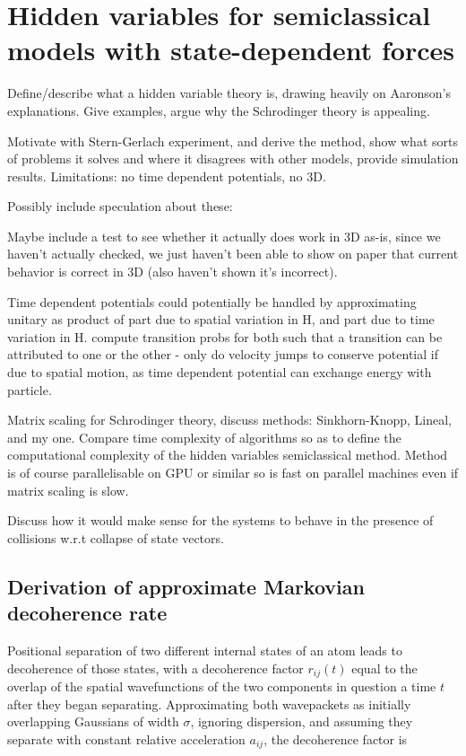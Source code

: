 
\chapter{Hidden variables for semiclassical models with state-dependent forces}

Define/describe what a hidden variable theory is, drawing heavily on Aaronson's~\cite{Aaronson2005} explanations. Give examples, argue why the Schrodinger theory is appealing.

Motivate with Stern-Gerlach experiment, and derive the method, show what sorts of problems it
solves and where it disagrees with other models, provide simulation results. Limitations: no time dependent potentials, no 3D.

Possibly include speculation about these:

Maybe include a test to see whether it actually does work in 3D as-is, since we haven't actually checked, we just haven't been able to show on paper that current behavior is correct in 3D (also haven't shown it's incorrect).

Time dependent potentials could potentially be handled by approximating unitary as product of part due to spatial variation in H, and part due to time variation in H. compute transition probs for both such that a transition can be attributed to one or the other - only do velocity jumps to conserve potential if due to spatial motion, as time dependent potential can exchange energy with particle.

Matrix scaling for Schrodinger theory, discuss methods: Sinkhorn-Knopp, Lineal, and my one. Compare time complexity of algorithms so as to define the computational complexity of the hidden variables semiclassical method. Method is of course parallelisable on GPU or similar so is fast on parallel machines even if matrix scaling is slow.

Discuss how it would make sense for the systems to behave in the presence of collisions w.r.t collapse of state vectors.

\section{Derivation of approximate Markovian decoherence rate}

Positional separation of two different internal states of an atom leads to decoherence of those states, with a decoherence factor $r_{ij}(t)$ equal to the overlap of the spatial wavefunctions of the two components in question a time $t$ after they began separating. Approximating both wavepackets as initially overlapping Gaussians of width $\sigma$, ignoring dispersion, and assuming they separate with constant relative acceleration $a_{ij}$, the decoherence factor is

